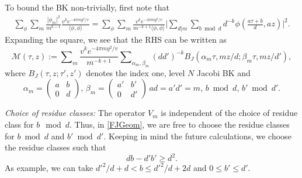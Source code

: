 \documentclass[11pt]{amsart}
\numberwithin{equation}{section}
\theoremstyle{plain}
\theoremstyle{definition}
\newcommand{\mc}{\mathcal}
\newcommand{\lan}{\langle }
\newcommand{\ran}{\rangle}
\newcommand{\sumn}{\sum \nolimits}
\newcommand{\smat}[4]{\left( \begin{smallmatrix}#1&#2\\#3&#4\end{smallmatrix}\right)}
\begin{document}
To bound the BK non-trivially, first note that
\begin{align}
    \sum_\phi\sum_m\frac{ |\phi_m|^2 }{m^{k-1} } \frac{ v^k e^{- 4 \pi m y^2/v} }{\lan \phi,\phi \ran} = \sum_\phi\sum_m \frac{v^{k}e^{-4\pi my^2/v}}{m^{-k+1} \lan \phi,\phi \ran} \Big|\sum_{d|m}\sum_{b\bmod d}d^{-k}\phi\left(\frac{a\tau+b}{d},az\right)\Big|^2.
\end{align}
Expanding the square, we see that the RHS can be written as
\begin{equation}\label{FJGeom}
    \mc M(\tau, z):=\sumn_m \frac{v^{k}e^{-4\pi my^2/v}}{m^{-k+1}}\sumn_{\alpha_m, \beta_m} (dd')^{-k} B_J(\alpha_m\tau, mz/d;\beta_m\tau, mz/d'),
\end{equation}
where $B_J(\tau,z;\tau',z')$ denotes the index one, level $N$ Jacobi BK and 
\begin{equation}
    \alpha_m=\smat{a}{b}{0}{d},\, \beta_m=\smat{a'}{b'}{0}{d'}\, ad=a'd'=m,\, b \bmod d,\, b'\bmod d'.
\end{equation}

\noindent\textit{Choice of residue classes:}
    The operator $V_m$ is independent of the choice of residue class for $b \mod d$. Thus, in \eqref{FJGeom}, we are free to choose the residue classes for $b \bmod d$ and $b' \bmod d'$. Keeping in mind the future calculations, we choose the residue classes such that
    \begin{equation}
        db-d'b'\ge d^2.
    \end{equation}
As example, we can take $d'^2/d+d < b \le d'^2/d+2d$ and $0\le b' \le d'$.
\end{document}
